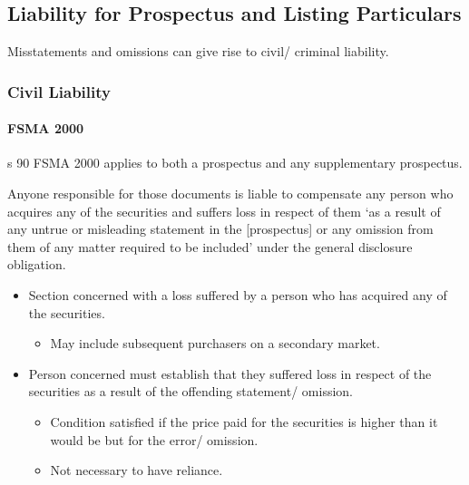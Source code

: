 \documentclass[
]{article}
\providecommand{\tightlist}{%
  \setlength{\itemsep}{0pt}\setlength{\parskip}{0pt}}
\begin{document}
\hypertarget{liability-for-prospectus-and-listing-particulars}{%
\subsection{Liability for Prospectus and Listing
Particulars}\label{liability-for-prospectus-and-listing-particulars}}

Misstatements and omissions can give rise to civil/ criminal liability.

\hypertarget{civil-liability}{%
\subsubsection{Civil Liability}\label{civil-liability}}

\hypertarget{fsma-2000}{%
\paragraph{FSMA 2000}\label{fsma-2000}}

s 90 FSMA 2000 applies to both a prospectus and any supplementary
prospectus.

Anyone responsible for those documents is liable to compensate any
person who acquires any of the securities and suffers loss in respect of
them `as a result of any untrue or misleading statement in the
{[}prospectus{]} or any omission from them of any matter required to be
included' under the general disclosure obligation.

\begin{itemize}
\tightlist
\item
  Section concerned with a loss suffered by a person who has acquired
  any of the securities.

  \begin{itemize}
  \tightlist
  \item
    May include subsequent purchasers on a secondary market.
  \end{itemize}
\item
  Person concerned must establish that they suffered loss in respect of
  the securities as a result of the offending statement/ omission.

  \begin{itemize}
  \tightlist
  \item
    Condition satisfied if the price paid for the securities is higher
    than it would be but for the error/ omission.
  \item
    Not necessary to have reliance.
  \end{itemize}
\end{itemize}
\end{document}
